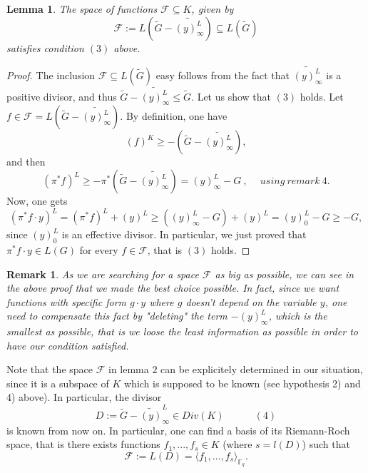 \documentclass[10pt]{article}
\newtheorem{lem1}{Lemma}[]
\newtheorem{rq1}{Remark}[]
\newcommand{\s}{\vspace{0.3cm}}
\newcommand{\cd}{\cdot}
\newcommand{\fq}{\mathbb{F}_q}
\newcommand{\su}{\subseteq}
\begin{document}
\s

\begin{lem1}
The space of functions $\mathcal{F} \su K$, given by 
\[\mathcal{F} := L\left(\widetilde{G}-\widetilde{(y)^L_{\infty}}\right) \su L(\tilde{G})\]
satisfies condition $(3)$ above.
\end{lem1}

\s

\begin{proof}
The inclusion $\mathcal{F} \su L(\tilde{G})$ easy follows from the fact that $\widetilde{(y)^L_{\infty}}$ is a positive divisor, and thus $\tilde{G}-\widetilde{(y)^L_{\infty}} \leq \tilde{G}$. Let us show that $(3)$ holds. Let $f \in \mathcal{F} =  L\left(\tilde{G}-\widetilde{(y)^L_{\infty}}\right)$. By definition, one have 
\[(f)^K \geq -\left(\tilde{G}-\widetilde{(y)^L_{\infty}}\right),\]
and then 
\[(\pi^*f)^L \geq -\pi^*\left(\tilde{G}-\widetilde{(y)^L_{\infty}}\right) = (y)^L_{\infty} - G \ , \ \quad using \ remark \ 4.\]
Now, one gets 
\[(\pi^*f \cd y)^L = (\pi^*f)^L  + (y)^L \geq  ((y)^L_{\infty} - G)+(y)^L = (y)^L_0 - G \geq -G,\]
since $(y)^L_0$ is an effective divisor. In particular, we just proved that $\pi^*f \cd y \in L(G)$ for every $f \in \mathcal{F}$, that is $(3)$ holds.
\end{proof}

\s

\begin{rq1} \rm
As we are searching for a space $\mathcal{F}$ as big as possible, we can see in the above proof that we made the best choice possible. In fact, since we want functions with specific form $g \cd y$ where $g$ doesn't depend on the variable $y$, one need to compensate this fact by "deleting" the term $-(y)^L_{\infty}$, which is the smallest as possible, that is we loose the least information as possible in order to have our condition satisfied. 
\end{rq1}

\s

Note that the space $\mathcal{F}$ in lemma $2$ can be explicitely determined in our situation, since it is a subspace of $K$ which is supposed to be known (see hypothesis 2) and 4) above). In particular, the divisor 
\[D := \tilde{G} - \widetilde{(y)}^L_{\infty} \in Div(K) \quad \quad \quad (4)\]
is known from now on. In particular, one can find a basis of its Riemann-Roch space, that is there exists functions $f_1,...,f_s \in K$ (where $s=l(D)$) such that 
\[\mathcal{F} := L(D) = \langle f_1,...,f_s \rangle_{\fq}.\]
\end{document}
